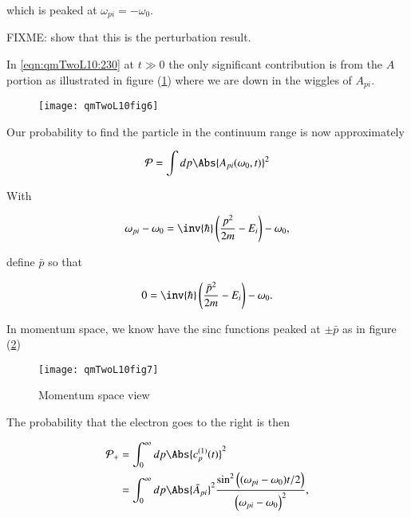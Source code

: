 which is peaked at $\omega_{pi} = -\omega_0$.

FIXME: show that this is the perturbation result.

In \ref{eqn:qmTwoL10:230} at $t \gg 0$ the only significant contribution is from the $A$ portion as illustrated in figure (\ref{fig:qmTwoL10:qmTwoL10fig6}) where we are down in the wiggles of $A_{pi}$.

\begin{figure}[htp]
   \centering
   \texttt{[image: qmTwoL10fig6]}
\label{fig:qmTwoL10:qmTwoL10fig6}
\end{figure}

Our probability to find the particle in the continuum range is now approximately

\begin{equation}\label{eqn:qmTwoL10:290}
\mathcal{P} = \int dp \Abs{
A_{pi}(\omega_0, t)
}^2
\end{equation}

With 

\begin{equation}\label{eqn:qmTwoL10:310}
\omega_{pi} - \omega_0 = \inv{\hbar}\left( \frac{p^2}{2m} - E_i \right) - \omega_0,
\end{equation}

define $\bar{p}$ so that

\begin{equation}\label{eqn:qmTwoL10:330}
0 = \inv{\hbar}\left( \frac{\bar{p}^2}{2m} - E_i \right) - \omega_0.
\end{equation}

In momentum space, we know have the sinc functions peaked at $\pm \bar{p}$ as in figure (\ref{fig:qmTwoL10:qmTwoL10fig7})

\begin{figure}[htp]
   \centering
   \texttt{[image: qmTwoL10fig7]}
   \caption{Momentum space view}\label{fig:qmTwoL10:qmTwoL10fig7}
\end{figure}

The probability that the electron goes to the right is then

\begin{equation}\label{eqn:qmTwoL10:350}
\begin{aligned}
\mathcal{P}_{+} 
&= 
\int_0^\infty dp 
\Abs{
c_p^{(1)}(t)
}^2 \\
&=
\int_0^\infty dp 
\Abs{
\bar{A}_{pi}
}^2 
\frac{
\sin^2\left( (\omega_{pi} - \omega_0) t/2 \right)
}{
\left( \omega_{pi} - \omega_0 \right)^2
},
\end{aligned}
\end{equation}

